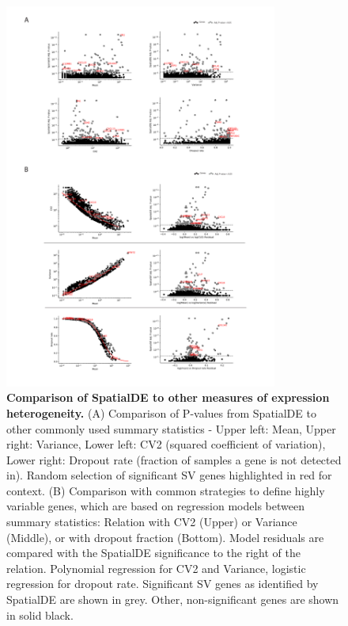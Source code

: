 \begin{figure}
    \centering
    \includegraphics[width=0.8\textwidth]{"SuppFig3"}
    \caption[Comparison of SpatialDE to other measures of expression heterogeneity]{\textbf{Comparison of SpatialDE to other measures of expression heterogeneity.} (A) Comparison of P-values from SpatialDE to other commonly used summary statistics - Upper left: Mean, Upper right: Variance, Lower left: CV2 (squared coefficient of variation), Lower right: Dropout rate (fraction of samples a gene is not detected in). Random selection of significant SV genes highlighted in red for context. (B) Comparison with common strategies to define highly variable genes, which are based on regression models between summary statistics: Relation with CV2 (Upper) or Variance (Middle), or with dropout fraction (Bottom). Model residuals are compared with the SpatialDE significance to the right of the relation. Polynomial regression for CV2 and Variance, logistic regression for dropout rate. Significant SV genes as identified by SpatialDE are shown in grey. Other, non-significant genes are shown in solid black.}
    \label{fig:ss3}
\end{figure}

